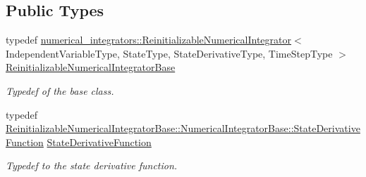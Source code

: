 \subsection*{Public Types}
\begin{DoxyCompactItemize}
\item 
typedef \hyperlink{classtudat_1_1numerical__integrators_1_1ReinitializableNumericalIntegrator}{numerical\+\_\+integrators\+::\+Reinitializable\+Numerical\+Integrator}$<$ Independent\+Variable\+Type, State\+Type, State\+Derivative\+Type, Time\+Step\+Type $>$ \hyperlink{classtudat_1_1numerical__integrators_1_1EulerIntegrator_a2c8237c92c141983162d39a002ede599}{Reinitializable\+Numerical\+Integrator\+Base}
\begin{DoxyCompactList}\small\item\em Typedef of the base class. \end{DoxyCompactList}\item 
typedef \hyperlink{classtudat_1_1numerical__integrators_1_1NumericalIntegrator_a0d0a5d48ebaf1f5ad9cd7a73b44be0fc}{Reinitializable\+Numerical\+Integrator\+Base\+::\+Numerical\+Integrator\+Base\+::\+State\+Derivative\+Function} \hyperlink{classtudat_1_1numerical__integrators_1_1EulerIntegrator_a868c812e8c32d247e52ca0800c6db198}{State\+Derivative\+Function}
\begin{DoxyCompactList}\small\item\em Typedef to the state derivative function. \end{DoxyCompactList}\end{DoxyCompactItemize}
